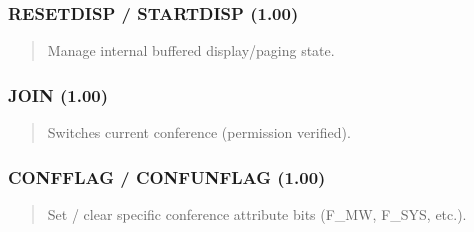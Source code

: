 \documentclass[letterpaper,10pt,english]{sphinxmanual}
\begin{document}
\subsubsection{RESETDISP / STARTDISP (1.00)}
\label{\detokenize{ppl:resetdisp-startdisp-1-00}}\begin{quote}

\sphinxAtStartPar
{}
\begin{description}
\sphinxAtStartPar
Manage internal buffered display/paging state.

\end{description}
\end{quote}


\subsubsection{JOIN (1.00)}
\label{\detokenize{ppl:join-1-00}}\begin{quote}

\sphinxAtStartPar
{}
\begin{description}
\sphinxAtStartPar
Switches current conference (permission verified).

\end{description}
\end{quote}


\subsubsection{CONFFLAG / CONFUNFLAG (1.00)}
\label{\detokenize{ppl:confflag-confunflag-1-00}}\begin{quote}

\sphinxAtStartPar
{}
\begin{description}
\sphinxAtStartPar
Set / clear specific conference attribute bits (F\_MW, F\_SYS, etc.).

\end{description}
\end{quote}
\end{document}
